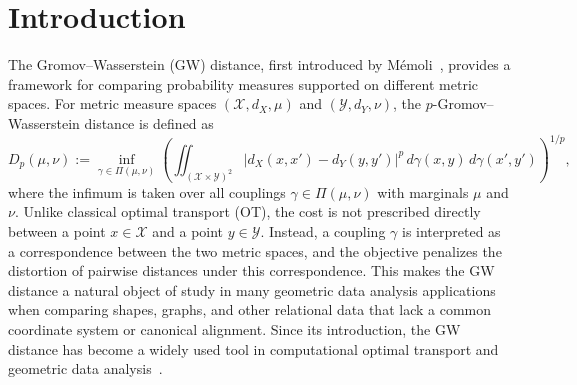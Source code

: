 \documentclass[11pt]{amsart}
\theoremstyle{definition}
\theoremstyle{remark}
\newcommand{\1}{\mathbf{1}}
\numberwithin{equation}{section}
\begin{document}
\section{Introduction}
The Gromov--Wasserstein (GW) distance, first introduced by M\'emoli~\cite{memoli2011gromov}, provides a framework for comparing probability measures supported on different metric spaces. For metric measure
spaces $(\mathcal X,d_X,\mu)$ and $(\mathcal Y,d_Y,\nu)$, the $p$-Gromov--Wasserstein distance is defined as
\begin{equation}
\label{eq:gw-distance}
    D_{p}(\mu,\nu)
    :=
    \inf_{\gamma \in \Pi(\mu,\nu)}
    \left(
        \iint_{(\mathcal X\times \mathcal Y)^2}
        \left|
            d_X(x,x') - d_Y(y,y')
        \right|^p
        \,d\gamma(x,y)\,d\gamma(x',y')
    \right)^{1/p},
\end{equation}
where the infimum is taken over all couplings $\gamma\in \Pi(\mu,\nu)$ with marginals $\mu$ and $\nu$. Unlike classical optimal transport (OT), the cost is not prescribed directly between a point $x \in \mathcal X$ and a point $y \in \mathcal Y$. Instead, a coupling $\gamma$ is interpreted as a correspondence between the two metric spaces, and the objective penalizes the distortion of pairwise distances under this correspondence. This makes the GW distance a natural object of study in many geometric data analysis applications when comparing shapes, graphs, and other relational data that lack a common coordinate system or canonical alignment. Since its introduction, the GW distance has become a widely used tool in computational optimal transport and geometric data analysis~\cite{chowdhury2019gromov,peyre2016gromov,vayer2019optimal,xu2019gromov}. 
\end{document}

